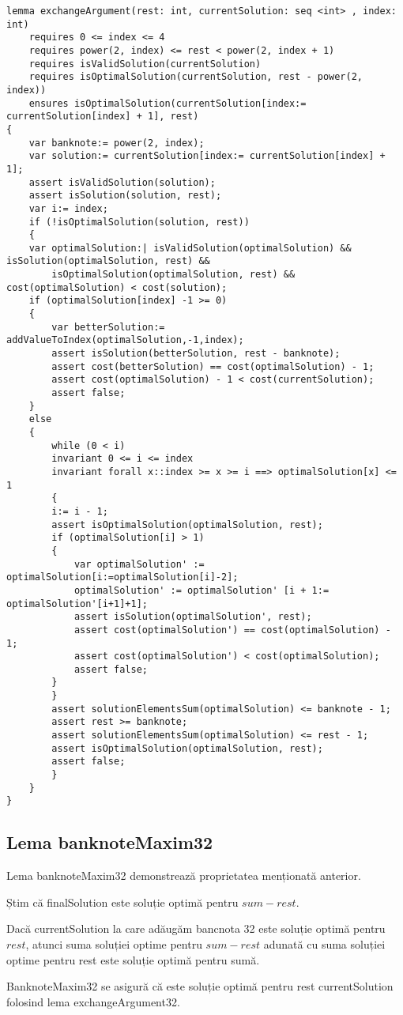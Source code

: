     
    \begin{lstlisting}
lemma exchangeArgument(rest: int, currentSolution: seq <int> , index: int)
    requires 0 <= index <= 4
    requires power(2, index) <= rest < power(2, index + 1)
    requires isValidSolution(currentSolution)
    requires isOptimalSolution(currentSolution, rest - power(2, index))
    ensures isOptimalSolution(currentSolution[index:= currentSolution[index] + 1], rest) 
{
    var banknote:= power(2, index);
    var solution:= currentSolution[index:= currentSolution[index] + 1];
    assert isValidSolution(solution);
    assert isSolution(solution, rest);
    var i:= index;
    if (!isOptimalSolution(solution, rest)) 
    {
    var optimalSolution:| isValidSolution(optimalSolution) && isSolution(optimalSolution, rest) &&
        isOptimalSolution(optimalSolution, rest) && cost(optimalSolution) < cost(solution);
    if (optimalSolution[index] -1 >= 0) 
    {
        var betterSolution:= addValueToIndex(optimalSolution,-1,index);
        assert isSolution(betterSolution, rest - banknote);
        assert cost(betterSolution) == cost(optimalSolution) - 1;
        assert cost(optimalSolution) - 1 < cost(currentSolution);
        assert false;
    } 
    else 
    {
        while (0 < i)
        invariant 0 <= i <= index
        invariant forall x::index >= x >= i ==> optimalSolution[x] <= 1 
        {
        i:= i - 1;
        assert isOptimalSolution(optimalSolution, rest);
        if (optimalSolution[i] > 1) 
        {
            var optimalSolution' := optimalSolution[i:=optimalSolution[i]-2];
            optimalSolution' := optimalSolution' [i + 1:= optimalSolution'[i+1]+1];
            assert isSolution(optimalSolution', rest);
            assert cost(optimalSolution') == cost(optimalSolution) - 1;
            assert cost(optimalSolution') < cost(optimalSolution);
            assert false;
        }
        }
        assert solutionElementsSum(optimalSolution) <= banknote - 1;
        assert rest >= banknote; 
        assert solutionElementsSum(optimalSolution) <= rest - 1; 
        assert isOptimalSolution(optimalSolution, rest); 
        assert false;
        }
    }
}
    \end{lstlisting}
        
    
\subsection{Lema banknoteMaxim32}
Lema banknoteMaxim32 demonstrează proprietatea menționată anterior.\par
Știm că finalSolution este soluție optimă pentru $sum-rest$.\par
Dacă currentSolution la care adăugăm bancnota 32 este soluție optimă pentru $rest$, atunci suma soluției optime 
pentru $sum-rest$ adunată cu suma soluției optime pentru rest este soluție optimă pentru sumă.  \par
BanknoteMaxim32 se asigură că este soluție optimă pentru rest currentSolution folosind lema exchangeArgument32.

